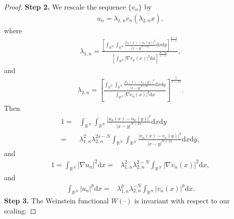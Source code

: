\documentclass[12pt,a4paper,reqno]{amsart}
\numberwithin{equation}{section}
\begin{document}
\begin{proof}
{\bf Step 2.}
We rescale the sequence $\{v_{n}\}$ by
\begin{equation*}
\begin{aligned}
u_{n}=\lambda_{1,n}v_{n}(\lambda_{2,n}x),
\end{aligned}
\end{equation*}
where
\begin{equation*}
\begin{aligned}
\lambda_{1,n}
=
\frac
{\left[\int_{\mathbb{R}^{N}}
\int_{\mathbb{R}^{N}}
\frac{|v_{n}(x)-v_{n}(y)|^{2}}{|x-y|^{N+2s}}
\mathrm{d}x
\mathrm{d}y
\right]^{\frac{N-2}{1-s}}}
{\left[\int_{\mathbb{R}^{N}}
|\nabla v_{n}(x)|^{2}
\mathrm{d}x
\right]^{\frac{N-2s}{1-s}}},
\end{aligned}
\end{equation*}
and
\begin{equation*}
\begin{aligned}
\lambda_{2,n}
=
\left[
\frac
{\int_{\mathbb{R}^{N}}
\int_{\mathbb{R}^{N}}
\frac{|v_{n}(x)-v_{n}(y)|^{2}}{|x-y|^{N+2s}}
\mathrm{d}x
\mathrm{d}y}
{\int_{\mathbb{R}^{N}}
|\nabla v_{n}(x)|^{2}
\mathrm{d}x}
\right]^{\frac{1}{2-2s}}.
\end{aligned}
\end{equation*}
Then
\begin{equation*}
\begin{aligned}
1=&
\int_{\mathbb{R}^{N}}
\int_{\mathbb{R}^{N}}
\frac{|u_{n}(x)-u_{n}(y)|^{2}}{|x-y|^{N+2s}}
\mathrm{d}x
\mathrm{d}y\\
=&
\lambda_{1,n}^{2}
\lambda_{2,n}^{2s-N}
\int_{\mathbb{R}^{N}}
\int_{\mathbb{R}^{N}}
\frac{|v_{n}(x)-v_{n}(y)|^{2}}{|x-y|^{N+2s}}
\mathrm{d}x
\mathrm{d}y,
\end{aligned}
\end{equation*}
and
\begin{equation*}
\begin{aligned}
1=
\int_{\mathbb{R}^{N}}
|\nabla u_{n}|^{2}
\mathrm{d}x
=&
\lambda_{1,n}^{2}
\lambda_{2,n}^{2-N}
\int_{\mathbb{R}^{N}}
|\nabla v_{n}(x)|^{2}
\mathrm{d}x,
\end{aligned}
\end{equation*}
and
\begin{equation*}
\begin{aligned}
\int_{\mathbb{R}^{N}}
|u_{n}|^{p}
\mathrm{d}x
=&\lambda_{1,n}^{p}
\lambda_{2,n}^{-N}
\int_{\mathbb{R}^{N}}
|v_{n}(x)|^{p}
\mathrm{d}x.
\end{aligned}
\end{equation*}
{\bf Step 3.}
The Weinstein functional $W(\cdot)$ is invariant with respect to our scaling:

\end{proof}
\end{document}
